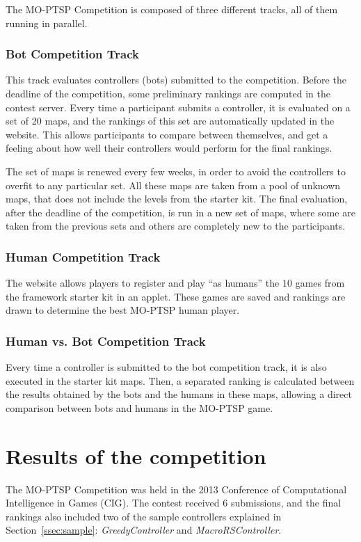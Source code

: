 \documentclass[conference]{IEEEtran}
\begin{document}
The MO-PTSP Competition is composed of three different tracks, all of them running in parallel.

\subsubsection{Bot Competition Track} This track evaluates controllers (bots) submitted to the competition. Before the deadline of the competition, some preliminary rankings are computed in the contest server. Every time a participant submits a controller, it is evaluated on a set of $20$ maps, and the rankings of this set are automatically updated in the website. This allows participants to compare between themselves, and get a feeling about how well their controllers would perform for the final rankings.

The set of maps is renewed every few weeks, in order to avoid the controllers to overfit to any particular set. All these maps are taken from a pool of unknown maps, that does not include the levels from the starter kit. The final evaluation, after the deadline of the competition, is run in a new set of maps, where some are taken from the previous sets and others are completely new to the participants.

\subsubsection{Human Competition Track} The website allows players to register and play ``as humans'' the $10$ games from the framework starter kit in an applet. These games are saved and rankings are drawn to determine the best MO-PTSP human player.

\subsubsection{Human vs. Bot Competition Track} Every time a controller is submitted to the bot competition track, it is also executed in the starter kit maps. Then, a separated ranking is calculated between the results obtained by the bots and the humans in these maps, allowing a direct comparison between bots and humans in the MO-PTSP game.

\section{Results of the competition} \label{sec:res}

The MO-PTSP Competition was held in the 2013  Conference of Computational Intelligence in Games (CIG). The contest received $6$ submissions, and the final rankings also included two of the sample controllers explained in Section~\ref{ssec:sample}: \textit{GreedyController} and \textit{MacroRSController}.
\end{document}
